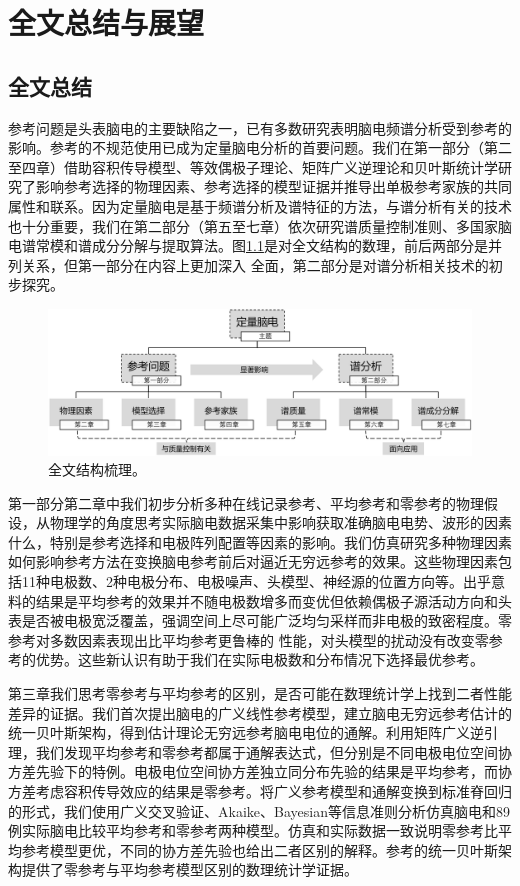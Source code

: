 \chapter{全文总结与展望}
\section{全文总结}
参考问题是头表脑电的主要缺陷之一，已有多数研究表明脑电频谱分析受到参考的影响。参考的不规范使用已成为定量脑电分析的首要问题。我们在第一部分（第二至四章）借助容积传导模型、等效偶极子理论、矩阵广义逆理论和贝叶斯统计学研究了影响参考选择的物理因素、参考选择的模型证据并推导出单极参考家族的共同属性和联系。因为定量脑电是基于频谱分析及谱特征的方法，与谱分析有关的技术也十分重要，我们在第二部分（第五至七章）依次研究谱质量控制准则、多国家脑电谱常模和谱成分分解与提取算法。图\ref{8:sum}是对全文结构的数理，前后两部分是并列关系，但第一部分在内容上更加深入
全面，第二部分是对谱分析相关技术的初步探究。
\begin{figure}[!h]
\includegraphics[width=\linewidth]{pic/sum/sum.png}
\caption{全文结构梳理。}
\label{8:sum}
\end{figure}

第一部分第二章中我们初步分析多种在线记录参考、平均参考和零参考的物理假设，从物理学的角度思考实际脑电数据采集中影响获取准确脑电电势、波形的因素什么，特别是参考选择和电极阵列配置等因素的影响。我们仿真研究多种物理因素如何影响参考方法在变换脑电参考前后对逼近无穷远参考的效果。这些物理因素包括11种电极数、2种电极分布、电极噪声、头模型、神经源的位置方向等。出乎意料的结果是平均参考的效果并不随电极数增多而变优但依赖偶极子源活动方向和头表是否被电极宽泛覆盖，强调空间上尽可能广泛均匀采样而非电极的致密程度。零参考对多数因素表现出比平均参考更鲁棒的
性能，对头模型的扰动没有改变零参考的优势。这些新认识有助于我们在实际电极数和分布情况下选择最优参考。

第三章我们思考零参考与平均参考的区别，是否可能在数理统计学上找到二者性能差异的证据。我们首次提出脑电的广义线性参考模型，建立脑电无穷远参考估计的统一贝叶斯架构，得到估计理论无穷远参考脑电电位的通解。利用矩阵广义逆引理，我们发现平均参考和零参考都属于通解表达式，但分别是不同电极电位空间协方差先验下的特例。电极电位空间协方差独立同分布先验的结果是平均参考，而协方差考虑容积传导效应的结果是零参考。将广义参考模型和通解变换到标准脊回归的形式，我们使用广义交叉验证、Akaike、Bayesian等信息准则分析仿真脑电和89例实际脑电比较平均参考和零参考两种模型。仿真和实际数据一致说明零参考比平均参考模型更优，不同的协方差先验也给出二者区别的解释。参考的统一贝叶斯架构提供了零参考与平均参考模型区别的数理统计学证据。

